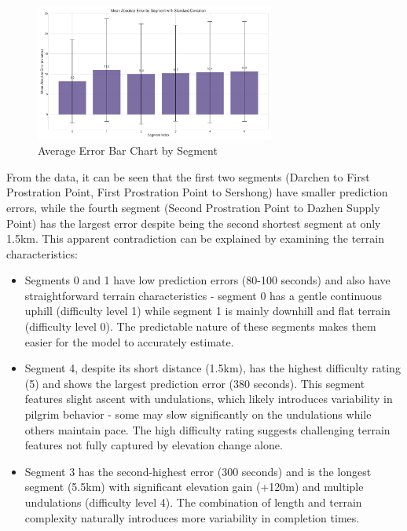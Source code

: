 \documentclass[12pt]{article}
\begin{document}
\begin{figure}[H]
\centering
\includegraphics[width=0.7\textwidth]{visualization_results/segment_error_barplot.png}
\caption{Average Error Bar Chart by Segment}
\label{fig:segment_error}
\end{figure}

From the data, it can be seen that the first two segments (Darchen to First Prostration Point, First Prostration Point to Sershong) have smaller prediction errors, while the fourth segment (Second Prostration Point to Dazhen Supply Point) has the largest error despite being the second shortest segment at only 1.5km. This apparent contradiction can be explained by examining the terrain characteristics:

\begin{itemize}
  \item Segments 0 and 1 have low prediction errors (80-100 seconds) and also have straightforward terrain characteristics - segment 0 has a gentle continuous uphill (difficulty level 1) while segment 1 is mainly downhill and flat terrain (difficulty level 0). The predictable nature of these segments makes them easier for the model to accurately estimate.
  
  \item Segment 4, despite its short distance (1.5km), has the highest difficulty rating (5) and shows the largest prediction error (380 seconds). This segment features slight ascent with undulations, which likely introduces variability in pilgrim behavior - some may slow significantly on the undulations while others maintain pace. The high difficulty rating suggests challenging terrain features not fully captured by elevation change alone.
  
  \item Segment 3 has the second-highest error (300 seconds) and is the longest segment (5.5km) with significant elevation gain (+120m) and multiple undulations (difficulty level 4). The combination of length and terrain complexity naturally introduces more variability in completion times.
\end{itemize}
\end{document}
